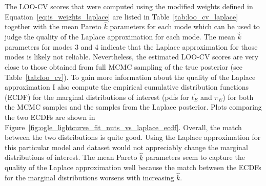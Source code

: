 \documentclass[12pt,dvipsnames]{report}
\begin{document}
The LOO-CV scores that were computed using the modified weights defined in 
Equation~\ref{eq:is_weights_laplace} are listed in Table~\ref{tab:loo_cv_laplace} 
together with the mean Pareto $\hat k$ parameters for each mode which can be used 
to judge the quality of the Laplace approximation for each mode. The mean 
$\hat k$ parameters for modes 3 and 4 indicate that the Laplace approximation
for those modes is likely not reliable. Nevertheless, the estimated LOO-CV scores are 
very close to those obtained from full MCMC sampling of the true posterior 
(see Table~\ref{tab:loo_cv}). To gain more information about the quality of the Laplace 
approximation I also compute the empirical cumulative distribution functions (ECDF)
for the marginal distributions of interest (pdfs for $t_E^\prime$ 
and $\pi_E$) for both the MCMC samples and the samples from the Laplace posterior.
Plots comparing the two ECDFs are shown in 
Figure~\ref{fig:ogle_lightcurve_fit_nuts_vs_laplace_ecdf}. Overall, the match between 
the two distributions is quite good. Using the Laplace approximation 
for this particular model and dataset would not appreciably change the marginal 
distributions of interest. 
The mean Pareto $\hat k$ parameters seem to capture the quality of the Laplace 
approximation well because the match between the ECDFs
for the marginal distributions worsens with increasing $\hat k$.
\end{document}
